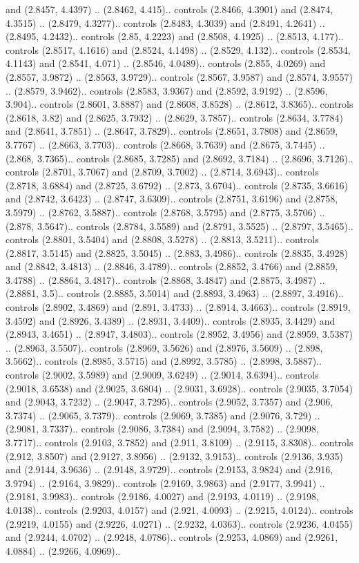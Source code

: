 and (2.8457, 4.4397) .. (2.8462, 4.415).. controls (2.8466, 4.3901) and (2.8474, 4.3515) .. (2.8479, 4.3277).. controls (2.8483, 4.3039) and (2.8491, 4.2641) .. (2.8495, 4.2432).. controls (2.85, 4.2223) and (2.8508, 4.1925) .. (2.8513, 4.177).. controls (2.8517, 4.1616) and (2.8524, 4.1498) .. (2.8529, 4.132).. controls (2.8534, 4.1143) and (2.8541, 4.071) .. (2.8546, 4.0489).. controls (2.855, 4.0269) and (2.8557, 3.9872) .. (2.8563, 3.9729).. controls (2.8567, 3.9587) and (2.8574, 3.9557) .. (2.8579, 3.9462).. controls (2.8583, 3.9367) and (2.8592, 3.9192) .. (2.8596, 3.904).. controls (2.8601, 3.8887) and (2.8608, 3.8528) .. (2.8612, 3.8365).. controls (2.8618, 3.82) and (2.8625, 3.7932) .. (2.8629, 3.7857).. controls (2.8634, 3.7784) and (2.8641, 3.7851) .. (2.8647, 3.7829).. controls (2.8651, 3.7808) and (2.8659, 3.7767) .. (2.8663, 3.7703).. controls (2.8668, 3.7639) and (2.8675, 3.7445) .. (2.868, 3.7365).. controls (2.8685, 3.7285) and (2.8692, 3.7184) .. (2.8696, 3.7126).. controls (2.8701, 3.7067) and (2.8709, 3.7002) .. (2.8714, 3.6943).. controls (2.8718, 3.6884) and (2.8725, 3.6792) .. (2.873, 3.6704).. controls (2.8735, 3.6616) and (2.8742, 3.6423) .. (2.8747, 3.6309).. controls (2.8751, 3.6196) and (2.8758, 3.5979) .. (2.8762, 3.5887).. controls (2.8768, 3.5795) and (2.8775, 3.5706) .. (2.878, 3.5647).. controls (2.8784, 3.5589) and (2.8791, 3.5525) .. (2.8797, 3.5465).. controls (2.8801, 3.5404) and (2.8808, 3.5278) .. (2.8813, 3.5211).. controls (2.8817, 3.5145) and (2.8825, 3.5045) .. (2.883, 3.4986).. controls (2.8835, 3.4928) and (2.8842, 3.4813) .. (2.8846, 3.4789).. controls (2.8852, 3.4766) and (2.8859, 3.4788) .. (2.8864, 3.4817).. controls (2.8868, 3.4847) and (2.8875, 3.4987) .. (2.8881, 3.5).. controls (2.8885, 3.5014) and (2.8893, 3.4963) .. (2.8897, 3.4916).. controls (2.8902, 3.4869) and (2.891, 3.4733) .. (2.8914, 3.4663).. controls (2.8919, 3.4592) and (2.8926, 3.4389) .. (2.8931, 3.4409).. controls (2.8935, 3.4429) and (2.8943, 3.4651) .. (2.8947, 3.4803).. controls (2.8952, 3.4956) and (2.8959, 3.5387) .. (2.8963, 3.5507).. controls (2.8969, 3.5626) and (2.8976, 3.5609) .. (2.898, 3.5662).. controls (2.8985, 3.5715) and (2.8992, 3.5785) .. (2.8998, 3.5887).. controls (2.9002, 3.5989) and (2.9009, 3.6249) .. (2.9014, 3.6394).. controls (2.9018, 3.6538) and (2.9025, 3.6804) .. (2.9031, 3.6928).. controls (2.9035, 3.7054) and (2.9043, 3.7232) .. (2.9047, 3.7295).. controls (2.9052, 3.7357) and (2.906, 3.7374) .. (2.9065, 3.7379).. controls (2.9069, 3.7385) and (2.9076, 3.729) .. (2.9081, 3.7337).. controls (2.9086, 3.7384) and (2.9094, 3.7582) .. (2.9098, 3.7717).. controls (2.9103, 3.7852) and (2.911, 3.8109) .. (2.9115, 3.8308).. controls (2.912, 3.8507) and (2.9127, 3.8956) .. (2.9132, 3.9153).. controls (2.9136, 3.935) and (2.9144, 3.9636) .. (2.9148, 3.9729).. controls (2.9153, 3.9824) and (2.916, 3.9794) .. (2.9164, 3.9829).. controls (2.9169, 3.9863) and (2.9177, 3.9941) .. (2.9181, 3.9983).. controls (2.9186, 4.0027) and (2.9193, 4.0119) .. (2.9198, 4.0138).. controls (2.9203, 4.0157) and (2.921, 4.0093) .. (2.9215, 4.0124).. controls (2.9219, 4.0155) and (2.9226, 4.0271) .. (2.9232, 4.0363).. controls (2.9236, 4.0455) and (2.9244, 4.0702) .. (2.9248, 4.0786).. controls (2.9253, 4.0869) and (2.9261, 4.0884) .. (2.9266, 4.0969).. 